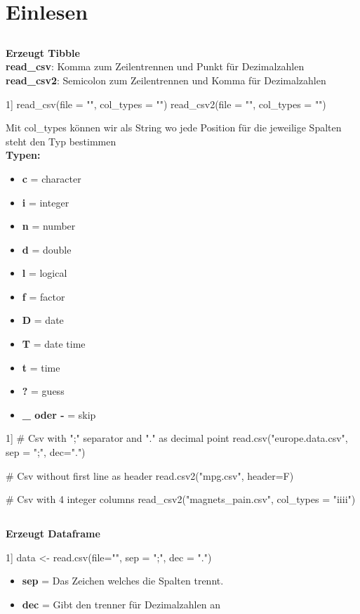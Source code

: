\section{Einlesen}
\subsection{}
\textbf{Erzeugt Tibble}\\
\textbf{read\_csv}: Komma zum Zeilentrennen und Punkt für Dezimalzahlen\\
\textbf{read\_csv2}: Semicolon zum Zeilentrennen und Komma für Dezimalzahlen
\begin{rcode}{1]}
read_csv(file = "", col_types = "")
read_csv2(file = "", col_types = "")
\end{rcode}
Mit col\_types können wir als String wo jede Position für die jeweilige Spalten steht den Typ bestimmen\\
\textbf{Typen:}
\begin{itemize}[noitemsep]
  \item \textbf{c} = character
  \item \textbf{i} = integer
  \item \textbf{n} = number
  \item \textbf{d} = double
  \item \textbf{l} = logical
  \item \textbf{f} = factor
  \item \textbf{D} = date
  \item \textbf{T} = date time
  \item \textbf{t} = time
  \item \textbf{?} = guess
  \item \textbf{\_ oder -} = skip
\end{itemize}
\begin{rcode}{1]}
# Csv with ";" separator and "." as decimal point
read.csv("europe.data.csv", sep = ";", dec=".")

# Csv without first line as header
read.csv2("mpg.csv", header=F)

# Csv with 4 integer columns
read_csv2("magnets_pain.csv", col_types = "iiii")
\end{rcode}
\subsection{}
\textbf{Erzeugt Dataframe}
\begin{rcode}{1]}
data <- read.csv(file="", sep = ";", dec = ".") %
\end{rcode}
\begin{itemize}[noitemsep]
  \item \textbf{sep} = Das Zeichen welches die Spalten trennt.
  \item \textbf{dec} = Gibt den trenner für Dezimalzahlen an
\end{itemize}
